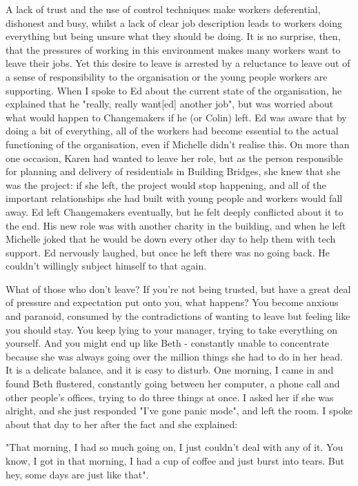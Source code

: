 A lack of trust and the use of control techniques make workers deferential, dishonest and busy, whilst a lack of clear job description leads to workers doing everything but being unsure what they should be doing. It is no surprise, then, that the pressures of working in this environment makes many workers want to leave their jobs. Yet this desire to leave is arrested by a reluctance to leave out of a sense of responsibility to the organisation or the young people workers are supporting. When I spoke to Ed about the current state of the organisation, he explained that he "really, really want[ed] another job", but was worried about what would happen to Changemakers if he (or Colin) left. Ed was aware that by doing a bit of everything, all of the workers had become essential to the actual functioning of the organisation, even if Michelle didn't realise this. On more than one occasion, Karen had wanted to leave her role, but as the person responsible for planning and delivery of residentials in Building Bridges, she knew that she was the project: if she left, the project would stop happening, and all of the important relationships she had built with young people and workers would fall away. Ed left Changemakers eventually, but he felt deeply conflicted about it to the end. His new role was with another charity in the building, and when he left Michelle joked that he would be down every other day to help them with tech support. Ed nervously laughed, but once he left there was no going back. He couldn't willingly subject himself to that again.

What of those who don't leave? If you're not being trusted, but have a great deal of pressure and expectation put onto you, what happens? You become anxious and paranoid, consumed by the contradictions of wanting to leave but feeling like you should stay. You keep lying to your manager, trying to take everything on yourself. And you might end up like Beth - constantly unable to concentrate because she was always going over the million things she had to do in her head. It is a delicate balance, and it is easy to disturb. One morning, I came in and found Beth flustered, constantly going between her computer, a phone call and other people's offices, trying to do three things at once. I asked her if she was alright, and she just responded "I've gone panic mode", and left the room. I spoke about that day to her after the fact and she explained:

"That morning, I had so much going on, I just couldn't deal with any of it. You know, I got in that morning, I had a cup of coffee and just burst into tears. But hey, some days are just like that".

